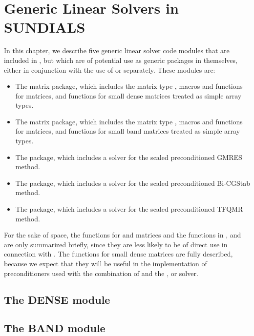 \chapter{Generic Linear Solvers in SUNDIALS}\label{s:gen_linsolv}
In this chapter, we describe five generic linear solver code modules that 
are included in {\cvodes}, but which are of potential use as generic packages in
themselves, either in conjunction with the use of {\cvodes} or separately.
These modules are:
\begin{itemize}
\item The {\dense} matrix package, which includes the matrix type ,
      macros and functions for  matrices, and functions
      for small dense matrices treated as simple array types.
\item The {\band} matrix package, which includes the matrix type ,
      macros and functions for  matrices, and functions
      for small band matrices treated as simple array types.
\item The {\spgmr} package, which includes a solver for the scaled
      preconditioned GMRES method.
\item The {\spbcg} package, which includes a solver for the scaled
      preconditioned Bi-CGStab method.
\item The {\sptfqmr} package, which includes a solver for the scaled
      preconditioned TFQMR method.
\end{itemize}

For the sake of space, the functions for  and
 matrices and the functions in {\spgmr}, {\spbcg} and {\sptfqmr}
are only summarized briefly, since they are less likely to be of direct use
in connection with {\cvodes}.  The functions for small dense matrices are fully
described, because we expect that they will be useful in the
implementation of preconditioners used with the combination of {\cvodes}
and the {\cvspgmr}, {\cvspbcg} or {\cvsptfqmr} solver.

\section{The DENSE module}\label{ss:dense}


\section{The BAND module}\label{ss:band}


